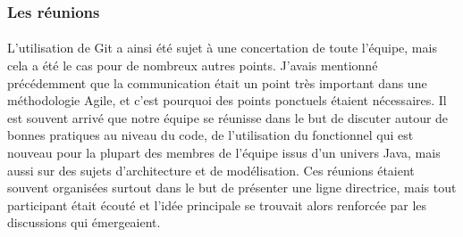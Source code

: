 \subsubsection{Les réunions}
\label{subs:Les réunions}
\paragraph{}
L'utilisation de Git a ainsi été sujet à une concertation de toute l'équipe, mais cela a été le cas pour de nombreux autres points.
J'avais mentionné précédemment que la communication était un point très important dans une méthodologie Agile, et c'est pourquoi des points ponctuels étaient nécessaires.
Il est souvent arrivé que notre équipe se réunisse dans le but de discuter autour de bonnes pratiques au niveau du code, de l'utilisation du fonctionnel qui est nouveau pour la plupart des membres de l'équipe issus d'un univers Java, mais aussi sur des sujets d'architecture et de modélisation.
Ces réunions étaient souvent organisées surtout dans le but de présenter une ligne directrice, mais tout participant était écouté et l'idée principale se trouvait alors renforcée par les discussions qui émergeaient.
